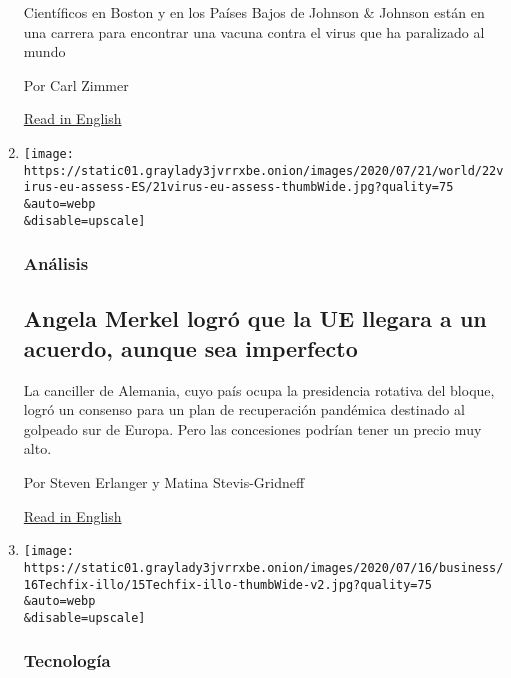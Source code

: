 \begin{enumerate}
  Científicos en Boston y en los Países Bajos de Johnson \& Johnson
  están en una carrera para encontrar una vacuna contra el virus que ha
  paralizado al mundo

  Por Carl Zimmer

  \href{https://www.nytimes3xbfgragh.onion/2020/07/17/health/coronavirus-vaccine-johnson-janssen.html}{Read
  in English}
\item
  \href{/es/2020/07/22/espanol/mundo/coronavirus-union-europea-estimulo.html}{}

  \texttt{[image: https://static01.graylady3jvrrxbe.onion/images/2020/07/21/world/22virus-eu-assess-ES/21virus-eu-assess-thumbWide.jpg?quality=75\\\&auto=webp\\\&disable=upscale]}

  \hypertarget{anuxe1lisis}{%
  \subsubsection{Análisis}\label{anuxe1lisis}}

  \hypertarget{angela-merkel-logruxf3-que-la-ue-llegara-a-un-acuerdo-aunque-sea-imperfecto}{%
  \subsection{Angela Merkel logró que la UE llegara a un acuerdo, aunque
  sea
  imperfecto}\label{angela-merkel-logruxf3-que-la-ue-llegara-a-un-acuerdo-aunque-sea-imperfecto}}

  La canciller de Alemania, cuyo país ocupa la presidencia rotativa del
  bloque, logró un consenso para un plan de recuperación pandémica
  destinado al golpeado sur de Europa. Pero las concesiones podrían
  tener un precio muy alto.

  Por Steven Erlanger y Matina Stevis-Gridneff

  \href{https://www.nytimes3xbfgragh.onion/2020/07/21/world/europe/european-union-coronavirus-aid.html}{Read
  in English}
\item
  \href{/es/2020/07/22/espanol/negocios/doomscrolling-que-es.html}{}

  \texttt{[image: https://static01.graylady3jvrrxbe.onion/images/2020/07/16/business/16Techfix-illo/15Techfix-illo-thumbWide-v2.jpg?quality=75\\\&auto=webp\\\&disable=upscale]}

  \hypertarget{tecnologuxeda}{%
  \subsubsection{Tecnología}\label{tecnologuxeda}}


\end{enumerate}
